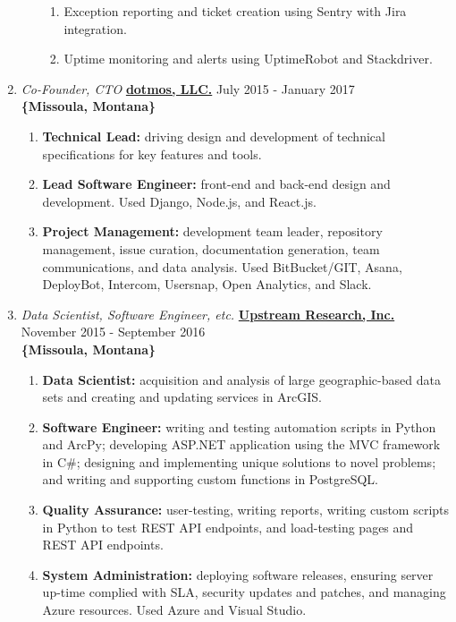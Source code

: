 \documentclass[oneside]{article}%
\begin{document}
\begin{enumerate}[]
\begin{enumerate}[]
\begin{enumerate}[-]
					\item Exception reporting and ticket creation using Sentry with Jira integration.
					\item Uptime monitoring and alerts using UptimeRobot and Stackdriver.
				\end{enumerate}
		\end{enumerate}
	\item \textit{Co-Founder, CTO} \textbf{\href{https://dotmos.com}{dotmos, LLC.}} \hfill July 2015 - January 2017\\
		\textbf{\{Missoula, Montana\}}
		\begin{enumerate}[*]
			\item \textbf{Technical Lead:} driving design and development of technical specifications for key features and tools.
			\item \textbf{Lead Software Engineer:} front-end and back-end design and development. Used Django, Node.js, and React.js.
			\item \textbf{Project Management:} development team leader, repository management, issue curation, documentation generation, team communications, and data analysis. Used BitBucket/GIT, Asana, DeployBot, Intercom, Usersnap, Open Analytics, and Slack.
		\end{enumerate}
\newpage
	\item \textit{Data Scientist, Software Engineer, etc.} \textbf{\href{https://upstreamresearch.com}{Upstream Research, Inc.}} \hfill November 2015 - September 2016\\
		\textbf{\{Missoula, Montana\}}
		\begin{enumerate}[*]
			\item \textbf{Data Scientist:} acquisition and analysis of large geographic-based data sets and creating and updating services in ArcGIS.
			\item \textbf{Software Engineer:} writing and testing automation scripts in Python and ArcPy; developing ASP.NET application using the MVC framework in C\#; designing and implementing unique solutions to novel problems; and writing and supporting custom functions in PostgreSQL.
			\item \textbf{Quality Assurance:} user-testing, writing reports, writing custom scripts in Python to test REST API endpoints, and load-testing pages and REST API endpoints.
			\item \textbf{System Administration:} deploying software releases, ensuring server up-time complied with SLA, security updates and patches, and managing Azure resources. Used Azure and Visual Studio.

\end{enumerate}
\end{enumerate}
\end{document}
